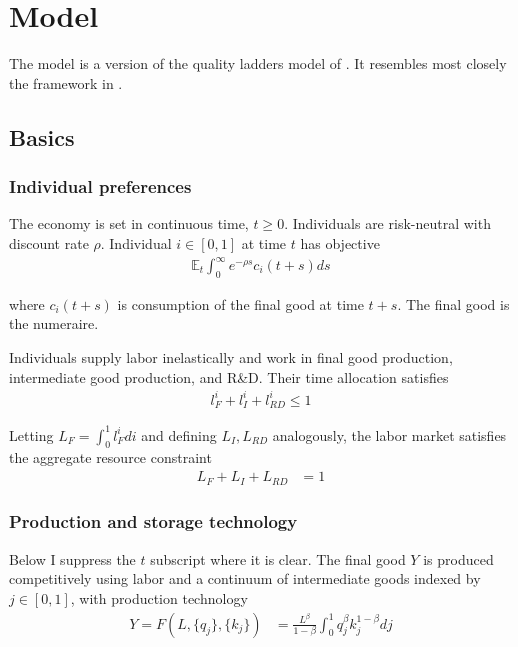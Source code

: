 \documentclass[11pt,english]{article}
\theoremstyle{remark}
\begin{document}
\section{Model}\label{model}

The model is a version of the quality ladders model of \cite{grossman_quality_1991}. It resembles most closely the framework in \cite{akcigit_growth_2018}.  

\subsection{Basics}

\subsubsection{Individual preferences}

The economy is set in continuous time, $t \ge 0$. Individuals are risk-neutral with discount rate $\rho$. Individual $i \in [0,1]$ at time $t$ has objective
\begin{align*}
 \mathbb{E}_t \int_0^{\infty} e^{-\rho s} c_i(t+s) ds
\end{align*}

where $c_i(t+s)$ is consumption of the final good at time $t+s$. The final good is the numeraire.

Individuals supply labor inelastically and work in final good production, intermediate good production, and R\&D. Their time allocation satisfies
\begin{align*}
l_F^i + l_I^i + l_{RD}^i \le 1
\end{align*}

Letting $L_F = \int_0^1 l_F^i di$ and defining $L_I,L_{RD}$ analogously, the labor market satisfies the aggregate resource constraint
\begin{align}
L_F + L_I + L_{RD} &= 1 \label{labor_resource_constraint}
\end{align}


\subsubsection{Production and storage technology}

Below I suppress the $t$ subscript where it is clear. The final good $Y$ is produced competitively using labor and a continuum of intermediate goods indexed by $j \in [0,1]$, with production technology
\begin{align*}
Y = F(L,\{q_j\},\{k_j\}) &= \frac{L^{\beta}}{1-\beta} \int_0^1 q_j^{\beta} k_j^{1-\beta} dj
\end{align*}
\end{document}

